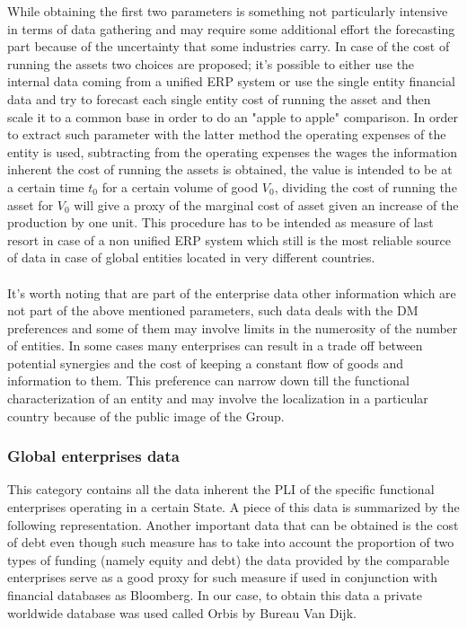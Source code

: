 \begin{doublespace}
While obtaining the first two parameters is something not particularly intensive in terms of data gathering and may require some additional effort the forecasting part because of the uncertainty that some industries carry. In case of the cost of running the assets two choices are proposed; it's possible to either use the internal data coming from a unified ERP system or use the single entity financial data and try to forecast each single entity cost of running the asset and then scale it to a common base in order to do an "apple to apple" comparison. In order to extract such parameter with the latter method the  operating expenses of the entity\cite{Williams2008} is used, subtracting from the operating expenses the wages the information inherent the cost of running the assets is obtained, the value is intended to be at a certain time $t_0$ for a certain volume of good $V_0$, dividing the cost of running the asset for $V_0$ will give a proxy of the marginal cost of asset given an increase of the production by one unit. This procedure has to be intended as measure of last resort in case of a non unified ERP system which still is the most reliable source of data in case of global entities located in very different countries. 
\\
\\
It's worth noting that are part of the enterprise data other information which are not part of the above mentioned parameters, such data deals with the DM preferences and some of them may involve limits in the numerosity of the number of entities. In some cases many enterprises can result in a trade off between potential synergies and the cost of keeping a constant flow of goods and information to them. This preference can narrow down till the functional characterization of an entity and may involve the localization in a particular country because of the public image of the Group.

\subsubsection{Global enterprises data}
This category contains all the data inherent the PLI of the specific functional enterprises operating in a certain State.
A piece of this data is summarized by the following representation. Another important data that can be obtained is the cost of debt \cite{Berman2013} even though such measure has to take into account the proportion of two types of funding (namely equity and debt) the data provided by the comparable enterprises serve as a good proxy for such measure if used in conjunction with financial databases as Bloomberg. In our case, to obtain this data a private worldwide database was used called Orbis by Bureau Van Dijk.


\end{doublespace}
